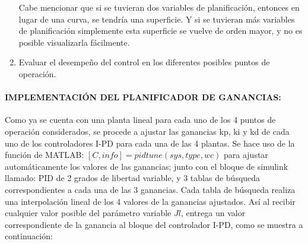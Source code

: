 \documentclass{article}
\begin{document}
\begin{sloppypar}
\begin{enumerate}
    Cabe mencionar que si se tuvieran dos variables de planificación, entonces en lugar de una curva, se tendría una superficie. Y si se tuvieran más variables de planificación simplemente esta superficie se vuelve de orden mayor, y no es posible visualizarla fácilmente.
    \item Evaluar el desempeño del control en los diferentes posibles puntos de operación.

\end{enumerate}

\paragraph{IMPLEMENTACIÓN DEL PLANIFICADOR DE GANANCIAS:}
\label{sec:IMPLEMENTACIÓN DEL PLANIFICADOR DE GANANCIAS:}
\hfill

\hfill

Como ya se cuenta con una planta lineal para cada uno de los 4 puntos de operación considerados, se procede a ajustar las ganancias kp, ki y kd de cada uno de los controladores I-PD para cada una de las 4 plantas. Se hace uso de la función de MATLAB: $[C,info]=pidtune(sys,type,wc)$ para ajustar automáticamente los valores de las ganancias; junto con el bloque de simulink llamado: PID de 2 grados de libertad variable, y 3 tablas de búsqueda correspondientes a cada una de las 3 ganancias. Cada tabla de búsqueda realiza una interpolación lineal de los 4 valores de la ganancias ajustados. Así al recibir cualquier valor posible del parámetro variable $Jl$, entrega un valor correspondiente de la ganancia al bloque del controlador I-PD, como se muestra a continuación:


\end{sloppypar}
\end{document}
